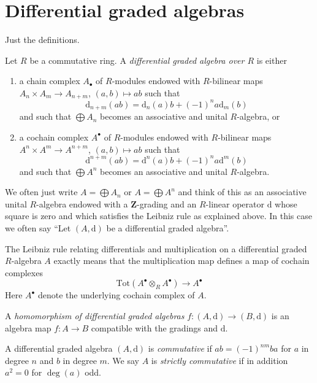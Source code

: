 \section{Differential graded algebras}
\label{section-dga}


\noindent
Just the definitions.

\begin{definition}
\label{definition-dga}
Let $R$ be a commutative ring. A {\it differential graded algebra over $R$}
is either
\begin{enumerate}
\item a chain complex $A_\bullet$ of $R$-modules endowed with
$R$-bilinear maps $A_n \times A_m \to A_{n + m}$,
$(a, b) \mapsto ab$ such that
$$
\text{d}_{n + m}(ab) = \text{d}_n(a)b + (-1)^n a\text{d}_m(b)
$$
and such that $\bigoplus A_n$ becomes an associative and unital
$R$-algebra, or
\item a cochain complex $A^\bullet$ of $R$-modules endowed with
$R$-bilinear maps $A^n \times A^m \to A^{n + m}$, $(a, b) \mapsto ab$
such that
$$
\text{d}^{n + m}(ab) = \text{d}^n(a)b + (-1)^n a\text{d}^m(b)
$$
and such that $\bigoplus A^n$ becomes an associative and unital $R$-algebra.
\end{enumerate}
\end{definition}

\noindent
We often just write $A = \bigoplus A_n$ or $A = \bigoplus A^n$ and
think of this as an associative unital $R$-algebra endowed with a
$\mathbf{Z}$-grading and an $R$-linear operator $\text{d}$ whose square
is zero and which satisfies the Leibniz rule as explained above. In this case
we often say ``Let $(A, \text{d})$ be a differential graded algebra''.

\medskip\noindent
The Leibniz rule relating differentials and multiplication on a differential
graded $R$-algebra $A$ exactly means that the multiplication map defines
a map of cochain complexes
$$
\text{Tot}(A^\bullet \otimes_R A^\bullet) \to A^\bullet
$$
Here $A^\bullet$ denote the underlying cochain complex of $A$.

\begin{definition}
\label{definition-homomorphism-dga}
A {\it homomorphism of differential graded algebras}
$f : (A, \text{d}) \to (B, \text{d})$ is an algebra map $f : A \to B$
compatible with the gradings and $\text{d}$.
\end{definition}

\begin{definition}
\label{definition-cdga}
A differential graded algebra $(A, \text{d})$ is {\it commutative} if
$ab = (-1)^{nm}ba$ for $a$ in degree $n$ and $b$ in degree $m$.
We say $A$ is {\it strictly commutative} if in addition $a^2 = 0$
for $\deg(a)$ odd.
\end{definition}

